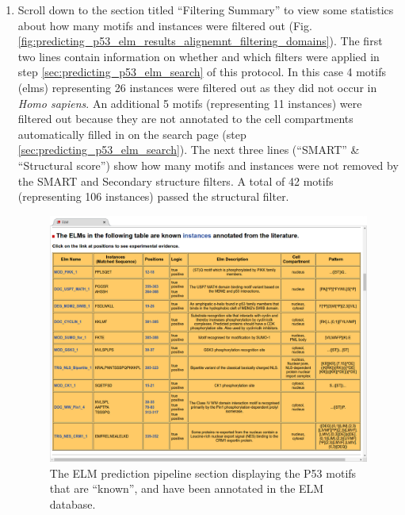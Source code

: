 \documentclass[12pt]{article}
\newcounter{proto}
\begin{document}
\begin{enumerate}
\item Scroll down to the section titled ``Filtering Summary'' to view some
	statistics about how many motifs and instances were filtered out
	(Fig.
	\ref{fig:predicting_p53_elm_results_alignemnt_filtering_domains}).
	The first two lines contain information on whether
	and which filters were applied in step \ref{sec:predicting_p53_elm_search} of this protocol.
	In this case 4 motifs (elms) representing 26 instances were filtered
	out as they did not occur in \textit{Homo sapiens}. An additional 5
	motifs (representing 11 instances) were filtered out because they are
	not annotated to the cell compartments automatically filled in on the
	search page (step \ref{sec:predicting_p53_elm_search}).
	The next three lines (``SMART'' \& ``Structural score'') show how many
	motifs and instances were not removed by the SMART and Secondary
	structure filters. A total of 42 motifs (representing 106 instances)
	passed the structural filter.


\begin{figure}[h!]
	\centering
	\includegraphics[width=\textwidth]{Figures/predicting_p53/elm_results_known.png}
	\caption{
		The ELM prediction pipeline section displaying the P53 motifs
		that are ``known'', and have been annotated in the ELM
		database.
	}
	\label{fig:predicting_p53_elm_results_known}
\end{figure}


\end{enumerate}
\end{document}
